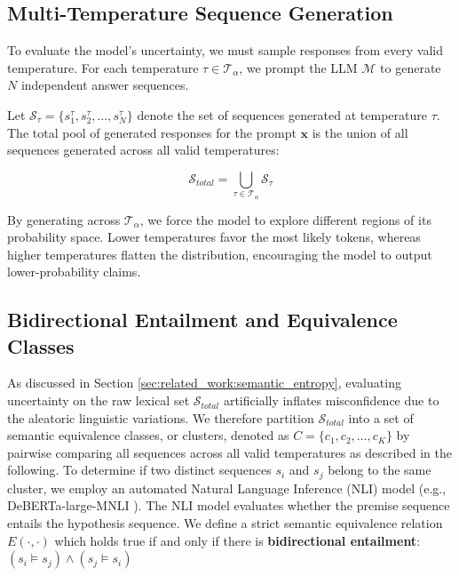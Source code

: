 \subsection{Multi-Temperature Sequence Generation}
\label{sec:methodology:generation:sequence_generation}
To evaluate the model's uncertainty, we must sample responses from 
every valid temperature.
For each temperature $\tau \in \mathcal{T}_\alpha$, we prompt the 
LLM $\mathcal{M}$ to generate $N$ independent answer sequences.

Let $\mathcal{S}_\tau = \{ s_1^\tau, s_2^\tau, \dots, s_N^\tau \}$ 
denote the set of sequences generated at temperature $\tau$. The total
pool of generated responses for the prompt $\mathbf{x}$ is the union of all 
sequences generated across all valid temperatures:

\begin{equation}
    \mathcal{S}_{total} = \bigcup_{\tau \in \mathcal{T}_\alpha} 
	\mathcal{S}_\tau
    \label{eq:pool_of_sequences}
\end{equation}

By generating across $\mathcal{T}_\alpha$, we force the model to 
explore different regions of its probability space. Lower temperatures 
favor the most likely tokens, whereas higher temperatures flatten the 
distribution, encouraging the model to output lower-probability claims.


\subsection{Bidirectional Entailment and Equivalence Classes}
\label{sec:methodology:generation:entailment}
As discussed in Section \ref{sec:related_work:semantic_entropy}, 
evaluating uncertainty on the raw lexical set $\mathcal{S}_{total}$ 
artificially inflates misconfidence due to the aleatoric linguistic 
variations. We therefore partition $\mathcal{S}_{total}$ into a set of 
semantic equivalence classes, or clusters, denoted as 
$C = \{ c_1, c_2, \dots, c_K \}$ by pairwise comparing all sequences across
all valid temperatures as described in the following.
To determine if two distinct sequences $s_i$ and $s_j$ belong to the 
same cluster, we employ an automated Natural Language Inference (NLI)
model (e.g., DeBERTa-large-MNLI 
\cite{he2021debertadecodingenhancedbertdisentangled}).
The NLI model evaluates whether the premise sequence entails the 
hypothesis sequence. We define a strict semantic equivalence relation
$E(\cdot, \cdot)$ which holds true if and only if there is 
\textbf{bidirectional entailment}: 
$(s_i \models s_j) \land (s_j \models s_i)$

